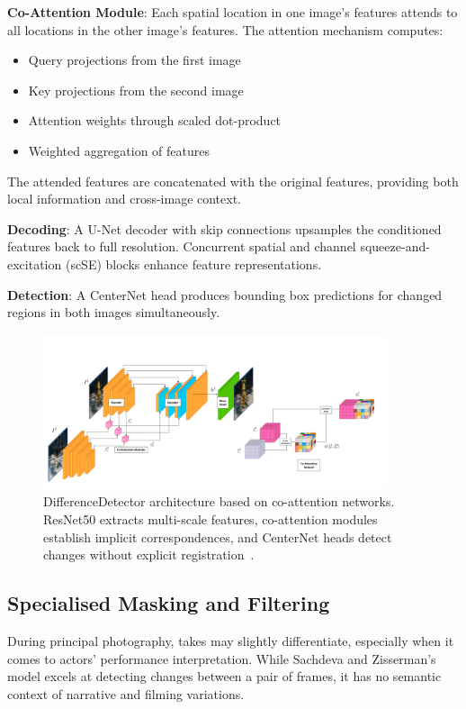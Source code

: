 \textbf{Co-Attention Module}: Each spatial location in one image's features attends to all locations in the other image's features. The attention mechanism computes:
\begin{itemize}
\item Query projections from the first image
\item Key projections from the second image
\item Attention weights through scaled dot-product
\item Weighted aggregation of features
\end{itemize}
The attended features are concatenated with the original features, providing both local information and cross-image context.

\textbf{Decoding}: A U-Net decoder with skip connections upsamples the conditioned features back to full resolution. Concurrent spatial and channel squeeze-and-excitation (scSE) blocks enhance feature representations.

\textbf{Detection}: A CenterNet head produces bounding box predictions for changed regions in both images simultaneously.

\begin{figure}[h]
\centering
\includegraphics[width=0.9\textwidth]{figures/ArchitectureDifference.png}
\caption{DifferenceDetector architecture based on co-attention networks. ResNet50 extracts multi-scale features, co-attention modules establish implicit correspondences, and CenterNet heads detect changes without explicit registration~\cite{sachdeva2023change}.}
\label{fig:difference-architecture}
\end{figure}

\subsection{Specialised Masking and Filtering}
During principal photography, takes may slightly differentiate, especially when it comes to actors' performance interpretation. While Sachdeva and Zisserman's model excels at detecting changes between a pair of frames, it has no semantic context of narrative and filming variations.

